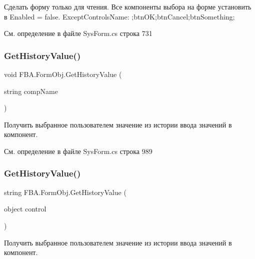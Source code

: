 Сделать форму только для чтения. Все компоненты выбора на форме установить в Enabled = false. Except\+Controls\+Name\+: ;btn\+OK;btn\+Cancel;btn\+Something; 

См. определение в файле Sys\+Form.\+cs строка 731

\mbox{\label{class_f_b_a_1_1_form_obj_a9871bab9051db11663e9ce108bf3f55c}} 
\subsubsection{\texorpdfstring{Get\+History\+Value()}{GetHistoryValue()}\hspace{0.1cm}{\footnotesize\ttfamily [1/2]}}
{\footnotesize\ttfamily void F\+B\+A.\+Form\+Obj.\+Get\+History\+Value (\begin{DoxyParamCaption}\item[{string}]{comp\+Name }\end{DoxyParamCaption})}



Получить выбранное пользователем значение из истории ввода значений в компонент. 



См. определение в файле Sys\+Form.\+cs строка 989

\mbox{\label{class_f_b_a_1_1_form_obj_ab91f339c5542cd51067b8e94dbbdd2d0}} 
\subsubsection{\texorpdfstring{Get\+History\+Value()}{GetHistoryValue()}\hspace{0.1cm}{\footnotesize\ttfamily [2/2]}}
{\footnotesize\ttfamily string F\+B\+A.\+Form\+Obj.\+Get\+History\+Value (\begin{DoxyParamCaption}\item[{object}]{control }\end{DoxyParamCaption})}



Получить выбранное пользователем значение из истории ввода значений в компонент. 



